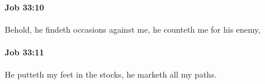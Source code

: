 		\paragraph{Job 33:10} %
			\label{JOB-33-10}

			Behold, he findeth occasions against me, he counteth me for his enemy,


		\paragraph{Job 33:11} %
			\label{JOB-33-11}

			He putteth my feet in the stocks, he marketh all my paths.


